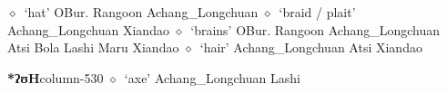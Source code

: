\hspace{1ex}
         $\diamond$~`hat'
         OBur. 
\hspace{1ex}
         Rangoon 
\hspace{1ex}
         Achang\_Longchuan 
\hspace{1ex}
         $\diamond$~`braid / plait'
         Achang\_Longchuan 
\hspace{1ex}
         Xiandao 
\hspace{1ex}
         $\diamond$~`brains'
         OBur. 
\hspace{1ex}
         Rangoon 
\hspace{1ex}
         Achang\_Longchuan 
\hspace{1ex}
         Atsi 
\hspace{1ex}
         Bola 
\hspace{1ex}
         Lashi 
\hspace{1ex}
         Maru 
\hspace{1ex}
         Xiandao 
\hspace{1ex}
         $\diamond$~`hair'
         Achang\_Longchuan 
\hspace{1ex}
         Atsi 
\hspace{1ex}
         Xiandao 
  \item {\footnotesize \textbf{*ʔʊH}}{\tiny column-530}
         $\diamond$~`axe'
         Achang\_Longchuan 
\hspace{1ex}
         Lashi 
